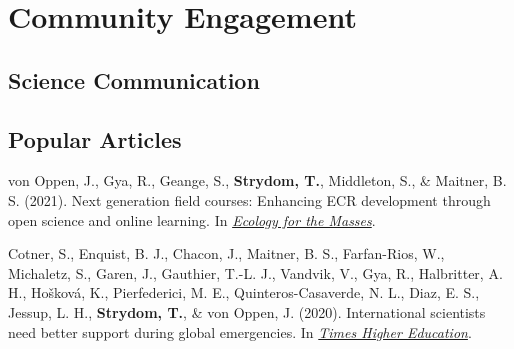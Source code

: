 \documentclass[11pt,a4paper,]{awesome-cv}
\newlength{\cslhangindent}
\newenvironment{CSLReferences}[2] %
 {%
  \setlength{\parindent}{0pt}
  \ifodd #1 \everypar{\setlength{\hangindent}{\cslhangindent}}\ignorespaces\fi
  \ifnum #2 > 0
  \setlength{\parskip}{#2\baselineskip}
  \fi
 }%
 {}
\begin{document}
\newpage

\hypertarget{community-engagement}{%
\section{Community Engagement}\label{community-engagement}}

\vspace{\baselineskip}

\hypertarget{science-communication}{%
\subsection{\texorpdfstring{\textbf{Science
Communication}}{Science Communication}}\label{science-communication}}

\begin{cventries}
    \vspace{-4.0mm}
\end{cventries}
\vspace{\baselineskip}

\hypertarget{popular-articles}{%
\subsection{\texorpdfstring{\textbf{Popular
Articles}}{Popular Articles}}\label{popular-articles}}

\hypertarget{refs-popular}{}
\begin{CSLReferences}{1}{0}
\leavevmode{}%
von Oppen, J., Gya, R., Geange, S., \textbf{Strydom, T.}, Middleton, S.,
\& Maitner, B. S. (2021). Next generation field courses: Enhancing ECR
development through open science and online learning. In
\emph{\href{https://ecologyforthemasses.com/2021/03/08/next-generation-field-courses-enhancing-ecr-development-through-open-science-and-online-learning/}{Ecology
for the Masses}}.

\leavevmode{}%
Cotner, S., Enquist, B. J., Chacon, J., Maitner, B. S., Farfan-Rios, W.,
Michaletz, S., Garen, J., Gauthier, T.-L. J., Vandvik, V., Gya, R.,
Halbritter, A. H., Hošková, K., Pierfederici, M. E.,
Quinteros-Casaverde, N. L., Diaz, E. S., Jessup, L. H.,
\textbf{Strydom, T.}, \& von Oppen, J. (2020). International scientists
need better support during global emergencies. In
\emph{\href{https://tinyurl.com/y5ccw9nb}{Times Higher Education}}.

\end{CSLReferences}
\end{document}
